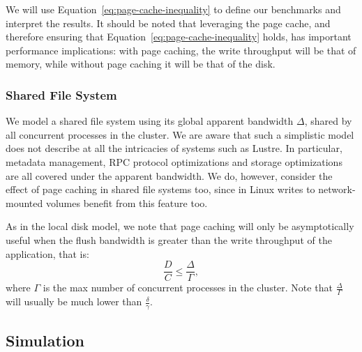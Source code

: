 \documentclass{IEEEtran}
\begin{document}
 We will use Equation~\ref{eq:page-cache-inequality} to 
define our benchmarks and interpret the results. It 
should be noted that leveraging the page cache, and therefore ensuring 
that Equation~\ref{eq:page-cache-inequality} holds, has important 
performance implications: with page caching, the write throughput will 
be that of memory, while without page caching it will be that of the 
disk.


\subsubsection{Shared File System}

We model a shared file system using its global apparent bandwidth 
$\Delta$, shared by all concurrent processes in the cluster. We are 
aware that such a simplistic model does not describe at all the 
intricacies of systems such as Lustre. In particular, metadata 
management, RPC protocol optimizations and storage optimizations are 
all covered under the apparent bandwidth. We do, however, consider the 
effect of page caching in shared file systems too, since in Linux 
writes to network-mounted volumes benefit from this feature too.

As in the local disk model, we note that page caching will only be asymptotically
useful when the flush bandwidth is greater than the write throughput of 
the application, that is:
\begin{equation}
\frac{D}{C} \leq \frac{\Delta}{\Gamma}, \label{eq:page-cache-sharedfs}
\end{equation}
where $\Gamma$ is the max number of concurrent processes in the cluster. 
Note that $\frac{\Delta}{\Gamma}$ will usually be much lower than 
$\frac{\delta}{\gamma}$.     


\subsection{Simulation} %


\end{document}
